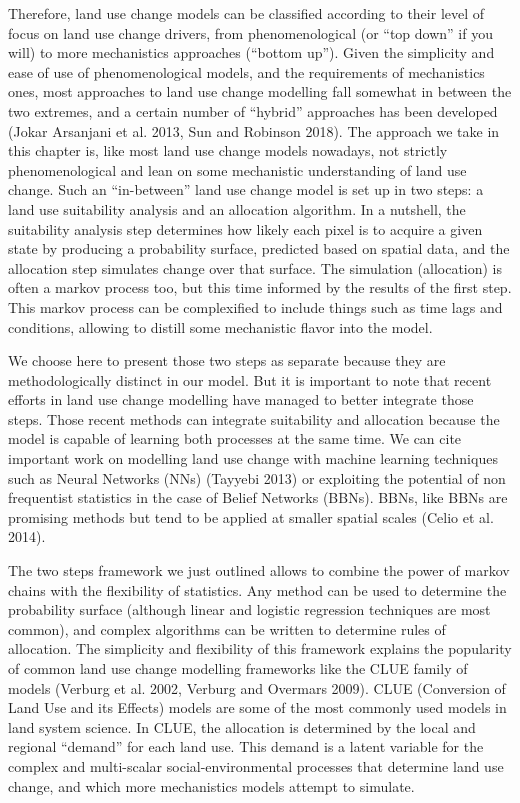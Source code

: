 Therefore, land use change models can be classified according to their level of focus on land use change drivers, from phenomenological (or “top down” if you will) to more mechanistics approaches (“bottom up”). Given the simplicity and ease of use of phenomenological models, and the requirements of mechanistics ones, most approaches to land use change modelling fall somewhat in between the two extremes, and a certain number of “hybrid” approaches has been developed (Jokar Arsanjani et al. 2013, Sun and Robinson 2018). The approach we take in this chapter is, like most land use change models nowadays, not strictly phenomenological and lean on some mechanistic understanding of land use change.
Such an “in-between” land use change model is set up in two steps: a land use suitability analysis and an allocation algorithm. In a nutshell, the suitability analysis step determines how likely each pixel is to acquire a given state by producing a probability surface, predicted based on spatial data, and the allocation step simulates change over that surface. The simulation (allocation) is often a markov process too, but this time informed by the results of the first step. This markov process can be complexified to include things such as time lags and conditions, allowing to distill some mechanistic flavor into the model.

We choose here to present those two steps as separate because they are methodologically distinct in our model. But it is important to note that recent efforts in land use change modelling have managed to better integrate those steps. Those recent methods can integrate suitability and allocation because the model is capable of learning both processes at the same time. We can cite important work on modelling land use change with machine learning techniques such as Neural Networks (NNs) (Tayyebi 2013) or exploiting the potential of non frequentist statistics in the case of Belief Networks (BBNs). BBNs, like BBNs are promising methods but tend to be applied at smaller spatial scales (Celio et al. 2014).

The two steps framework we just outlined allows to combine the power of markov chains with the flexibility of statistics. Any method can be used to determine the probability surface (although linear and logistic regression techniques are most common), and complex algorithms can be written to determine rules of allocation. The simplicity and flexibility of this framework explains the popularity of common land use change modelling frameworks like the CLUE family of models (Verburg et al. 2002, Verburg and Overmars 2009). CLUE (Conversion of Land Use and its Effects) models are some of the most commonly used models in land system science. In CLUE, the allocation is determined by the local and regional “demand” for each land use. This demand is a latent variable for the complex and multi-scalar social-environmental processes that determine land use change, and which more mechanistics models attempt to simulate.

